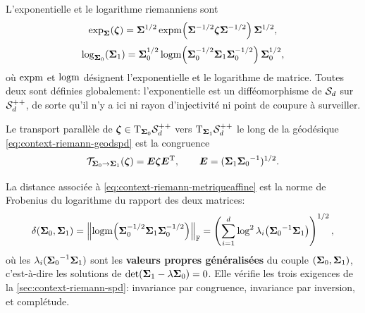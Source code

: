 \begin{property}
\label{prop:context-riemann-explogspd}
  L'exponentielle et le logarithme riemanniens sont
  \begin{equation}
    \exp_{\boldsymbol{\Sigma}}(\boldsymbol{\zeta})
    =
    \boldsymbol{\Sigma}^{1/2}\operatorname{\operatorname{expm}}\!\left(\boldsymbol{\Sigma}^{-1/2}\boldsymbol{\zeta}\boldsymbol{\Sigma}^{-1/2}\right)\boldsymbol{\Sigma}^{1/2}, 
  \end{equation}
  \begin{equation}
    \log_{\boldsymbol{\Sigma}_0}(\boldsymbol{\Sigma}_1)
    =
    \boldsymbol{\Sigma}_0^{1/2}\operatorname{\operatorname{logm}}\!\left(\boldsymbol{\Sigma}_0^{-1/2}\boldsymbol{\Sigma}_1\boldsymbol{\Sigma}_0^{-1/2}\right)\boldsymbol{\Sigma}_0^{1/2},
    \label{eq:context-riemann-explogspd}
  \end{equation}
  où $\operatorname{\operatorname{expm}}$ et $\operatorname{\operatorname{logm}}$ désignent l'exponentielle et le logarithme de matrice. Toutes deux sont définies globalement: l'exponentielle est un difféomorphisme de $\mathcal{S}_{d}$ sur $\mathcal{S}_{d}^{++}$, de sorte qu'il n'y a ici ni rayon d'injectivité ni point de coupure à surveiller.
\end{property}

\begin{property}
\label{prop:context-riemann-transportspd}
  Le transport parallèle de $\boldsymbol{\zeta}\in\mathrm{T}_{\boldsymbol{\Sigma}_0}\mathcal{S}_{d}^{++}$ vers $\mathrm{T}_{\boldsymbol{\Sigma}_1}\mathcal{S}_{d}^{++}$ le long de la géodésique \cref{eq:context-riemann-geodspd} est la congruence 
  \begin{equation}
    \mathcal{T}_{\boldsymbol{\Sigma}_0\to\boldsymbol{\Sigma}_1}(\boldsymbol{\zeta})=\boldsymbol{E}\boldsymbol{\zeta}\boldsymbol{E}^{\mathrm{T}},
    \qquad
    \boldsymbol{E}=(\boldsymbol{\Sigma}_1{\boldsymbol{\Sigma}_0}^{-1})^{1/2}.
    \label{eq:context-riemann-transportspd}
  \end{equation}
\end{property}

\begin{property}
\label{prop:context-riemann-distspd}
  La distance associée à \cref{eq:context-riemann-metriqueaffine} est la norme de Frobenius du logarithme du rapport des deux matrices:
  \begin{equation}
    \delta(\boldsymbol{\Sigma}_0,\boldsymbol{\Sigma}_1)
    =
    \left\lVert\operatorname{\operatorname{logm}}\!\left(\boldsymbol{\Sigma}_0^{-1/2}\boldsymbol{\Sigma}_1\boldsymbol{\Sigma}_0^{-1/2}\right)\right\rVert_{\mathbb{F}}
    =
    \left(
      \sum_{i=1}^{d}\log^2\lambda_i\!\left({\boldsymbol{\Sigma}_0}^{-1}\boldsymbol{\Sigma}_1\right)
    \right)^{1/2},
    \label{eq:context-riemann-distspd}
  \end{equation}
  où les $\lambda_i({\boldsymbol{\Sigma}_0}^{-1}\boldsymbol{\Sigma}_1)$ sont les \textbf{valeurs propres généralisées} du couple $(\boldsymbol{\Sigma}_0,\boldsymbol{\Sigma}_1)$, c'est-à-dire les solutions de $\operatorname{\operatorname{det}}(\boldsymbol{\Sigma}_1-\lambda\boldsymbol{\Sigma}_0)=0$. Elle vérifie les trois exigences de la \cref{sec:context-riemann-spd}: invariance par congruence, invariance par inversion, et complétude.
\end{property}

